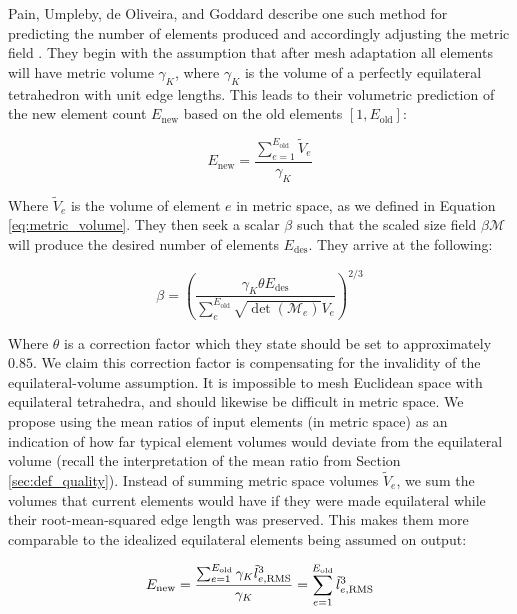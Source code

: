 Pain, Umpleby, de Oliveira, and Goddard describe one such method for
predicting the number of elements produced and accordingly adjusting
the metric field \cite{pain2001tetrahedral}.
They begin with the assumption that after mesh adaptation all elements
will have metric volume $\gamma_K$, where $\gamma_K$ is the volume of
a perfectly equilateral tetrahedron with unit edge lengths.
This leads to their volumetric prediction of the new element count
$E_\text{new}$ based on the old elements $[1,E_\text{old}]$:

\begin{equation}
E_{\text{new}} = \frac{\sum_{e=1}^{E_{\text{old}}} \tilde{V}_e}{\gamma_K}
\end{equation}

Where $\tilde{V}_e$ is the volume of element $e$ in metric space,
as we defined in Equation \ref{eq:metric_volume}.
They then seek a scalar $\beta$ such that the scaled size field
$\beta\mathcal{M}$ will produce the desired number of elements
$E_\text{des}$.
They arrive at the following:

\begin{equation}
\beta = \left(\frac{\gamma_K\theta E_{\text{des}}}
{\sum_e^{E_{\text{old}}} \sqrt{\det(\mathcal{M}_e)}V_e}\right)^{2/3}
\end{equation}

Where $\theta$ is a correction factor which they state should
be set to approximately $0.85$.
We claim this correction factor is compensating for the invalidity
of the equilateral-volume assumption.
It is impossible to mesh Euclidean space with equilateral tetrahedra,
and should likewise be difficult in metric space.
We propose using the mean ratios of input elements (in metric space)
as an indication of how far typical element volumes would deviate
from the equilateral volume (recall the interpretation of the
mean ratio from Section \ref{sec:def_quality}).
Instead of summing metric space volumes $\tilde{V}_e$, we sum
the volumes that current elements would have if they were
made equilateral while their root-mean-squared edge length was preserved.
This makes them more comparable to the idealized equilateral
elements being assumed on output:

\begin{equation}
E_{\text{new}} = \frac{\sum_{e=1}^{E_{\text{old}}}
\gamma_K \tilde{l}_{e,\text{RMS}}^3}{\gamma_K}
 = \sum_{e=1}^{E_{\text{old}}} \tilde{l}_{e,\text{RMS}}^3 \\
\end{equation}

